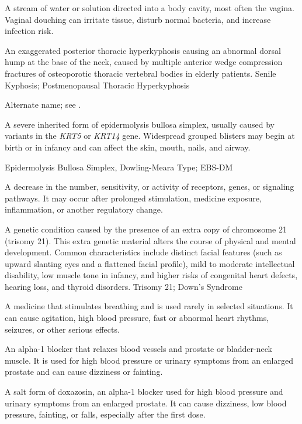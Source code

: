  A stream of water or solution directed into a body cavity, most often the vagina. Vaginal douching can irritate tissue, disturb normal bacteria, and increase infection risk.

 An exaggerated posterior thoracic hyperkyphosis causing an abnormal dorsal hump at the base of the neck, caused by multiple anterior wedge compression fractures of osteoporotic thoracic vertebral bodies in elderly patients.
\synonyms
Senile Kyphosis; Postmenopausal Thoracic Hyperkyphosis

 Alternate name; see .

 A severe inherited form of epidermolysis bullosa simplex, usually caused by variants in the \textit{KRT5} or \textit{KRT14} gene. Widespread grouped blisters may begin at birth or in infancy and can affect the skin, mouth, nails, and airway.

\synonyms
Epidermolysis Bullosa Simplex, Dowling-Meara Type; EBS-DM

 A decrease in the number, sensitivity, or activity of receptors, genes, or signaling pathways. It may occur after prolonged stimulation, medicine exposure, inflammation, or another regulatory change.

 A genetic condition caused by the presence of an extra copy of chromosome 21 (trisomy 21). This extra genetic material alters the course of physical and mental development. Common characteristics include distinct facial features (such as upward slanting eyes and a flattened facial profile), mild to moderate intellectual disability, low muscle tone in infancy, and higher risks of congenital heart defects, hearing loss, and thyroid disorders.
\synonyms
Trisomy 21; Down's Syndrome

 A medicine that stimulates breathing and is used rarely in selected situations. It can cause agitation, high blood pressure, fast or abnormal heart rhythms, seizures, or other serious effects.

 An alpha-1 blocker that relaxes blood vessels and prostate or bladder-neck muscle. It is used for high blood pressure or urinary symptoms from an enlarged prostate and can cause dizziness or fainting.

 A salt form of doxazosin, an alpha-1 blocker used for high blood pressure and urinary symptoms from an enlarged prostate. It can cause dizziness, low blood pressure, fainting, or falls, especially after the first dose.

